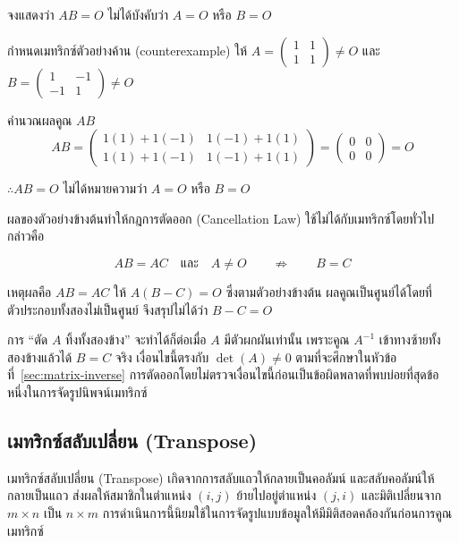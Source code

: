 \begin{ex}
\label{ex:zero-product}
จงแสดงว่า $AB = O$ ไม่ได้บังคับว่า $A = O$ หรือ $B = O$
\end{ex}
\begin{solution}
กำหนดเมทริกซ์ตัวอย่างค้าน (counterexample) ให้ $A = \begin{pmatrix} 1 & 1 \\ 1 & 1 \end{pmatrix} \neq O$ และ $B = \begin{pmatrix} 1 & -1 \\ -1 & 1 \end{pmatrix} \neq O$

คำนวณผลคูณ $AB$ \[ AB = \begin{pmatrix} 1(1)+1(-1) & 1(-1)+1(1) \\ 1(1)+1(-1) & 1(-1)+1(1) \end{pmatrix} = \begin{pmatrix} 0 & 0 \\ 0 & 0 \end{pmatrix} = O \]

$\therefore AB = O$ ไม่ได้หมายความว่า $A = O$ หรือ $B = O$ \solhere
\end{solution}

\begin{warning}
ผลของตัวอย่างข้างต้นทำให้กฎการตัดออก (Cancellation Law) ใช้ไม่ได้กับเมทริกซ์โดยทั่วไป กล่าวคือ

\[ AB = AC \quad \text{และ} \quad A \neq O \qquad \not\Rightarrow \qquad B = C \]

เหตุผลคือ $AB = AC$ ให้ $A(B - C) = O$ ซึ่งตามตัวอย่างข้างต้น ผลคูณเป็นศูนย์ได้โดยที่ตัวประกอบทั้งสองไม่เป็นศูนย์ จึงสรุปไม่ได้ว่า $B - C = O$

การ ``ตัด $A$ ทิ้งทั้งสองข้าง'' จะทำได้ก็ต่อเมื่อ $A$ มีตัวผกผันเท่านั้น เพราะคูณ $A^{-1}$ เข้าทางซ้ายทั้งสองข้างแล้วได้ $B = C$ จริง เงื่อนไขนี้ตรงกับ $\det(A) \neq 0$ ตามที่จะศึกษาในหัวข้อที่~\ref{sec:matrix-inverse} การตัดออกโดยไม่ตรวจเงื่อนไขนี้ก่อนเป็นข้อผิดพลาดที่พบบ่อยที่สุดข้อหนึ่งในการจัดรูปนิพจน์เมทริกซ์
\end{warning}

\subsection{เมทริกซ์สลับเปลี่ยน (Transpose)}
\label{ssec:matrix-transpose}
เมทริกซ์สลับเปลี่ยน (Transpose) เกิดจากการสลับแถวให้กลายเป็นคอลัมน์ และสลับคอลัมน์ให้กลายเป็นแถว ส่งผลให้สมาชิกในตำแหน่ง $(i, j)$ ย้ายไปอยู่ตำแหน่ง $(j, i)$ และมิติเปลี่ยนจาก $m \times n$ เป็น $n \times m$ การดำเนินการนี้นิยมใช้ในการจัดรูปแบบข้อมูลให้มีมิติสอดคล้องกันก่อนการคูณเมทริกซ์~\parencite{kolman2008discrete}

